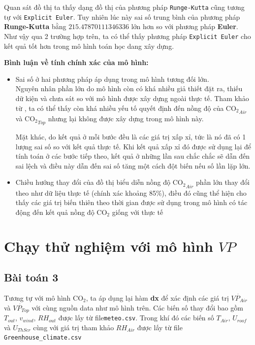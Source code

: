 \documentclass[a4paper]{article}
\begin{document}
Quan sát đồ thị ta thấy dạng đồ thị của phương pháp \texttt{Runge-Kutta} cũng tương tự với \texttt{Explicit Euler}. Tuy nhiên lúc này sai số trung bình của phương pháp \textbf{Runge-Kutta} bằng $215.47870111346336$ lớn hơn so với phương pháp \textbf{Euler}. Như vậy qua 2 trường hợp trên, ta có thể thấy phương pháp \texttt{Explicit Euler} cho kết quả tốt hơn trong mô hình toán học dang xây dựng. \par

\textbf{Bình luận về tính chính xác của mô hình:} \par
\begin{itemize}
    \item Sai số ở hai phương pháp áp dụng trong mô hình tương đối lớn. \\
    Nguyên nhân phần lớn do mô hình còn có khá nhiều giả thiết đặt ra, thiếu dữ kiện và chưa sát so với mô hình được xây dựng ngoài thực tế. Tham khảo từ \cite{vanthoor2011model}, ta có thể thấy còn khá nhiều yếu tố quyết định đến nồng độ của $\mathrm{CO_{2}}_{Air}$ và $\mathrm{CO_{2}}_{Top}$ nhưng lại không được xây dựng trong mô hình này.\par
    Mặt khác, do kết quả ở mỗi bước đều là các giá trị xấp xỉ, tức là nó đã có 1 lượng sai số so với kết quả thực tế. Khi kết quả xấp xỉ đó được sử dụng lại để tính toán ở các bước tiếp theo, kết quả ở những lần sau chắc chắc sẽ dẫn đến sai lệch và điều này dẫn đến sai số tăng một cách đột biến nếu số lần lặp lớn.
    \item Chiều hướng thay đổi của đồ thị biểu diễn nồng độ $\mathrm{CO_{2}}_{Air}$ phần lớn thay đổi theo như dữ liệu thực tế (chính xác khoảng 85\%), điều đó cũng thể hiện cho thấy các giá trị biến thiên theo thời gian được sử dụng trong mô hình có tác động đến kết quả nồng độ $\mathrm{CO_{2}}$ giống với thực tế
\end{itemize}

\newpage
\section{Chạy thử nghiệm với mô hình $VP$}
\subsection{Bài toán 3}
Tương tự với mô hình $\mathrm{CO_{2}}$, ta áp dụng lại hàm \textbf{dx} để xác định các giá trị $ \dot{VP_{Air}}$ và $ \dot{VP_{Top}}$ với cùng nguồn data như mô hình trên. Các biến số thay đổi bao gồm $T_{out}$, $v_{wind}$, $RH_{out}$ được lấy từ file\texttt{meteo.csv}. Trong khí đó các biến số $T_{Air}$, $U_{roof}$ và $U_{ThScr}$ cùng với giá trị tham khảo $RH_{Air}$ được lấy từ file \texttt{Greenhouse\_climate.csv}
\end{document}
